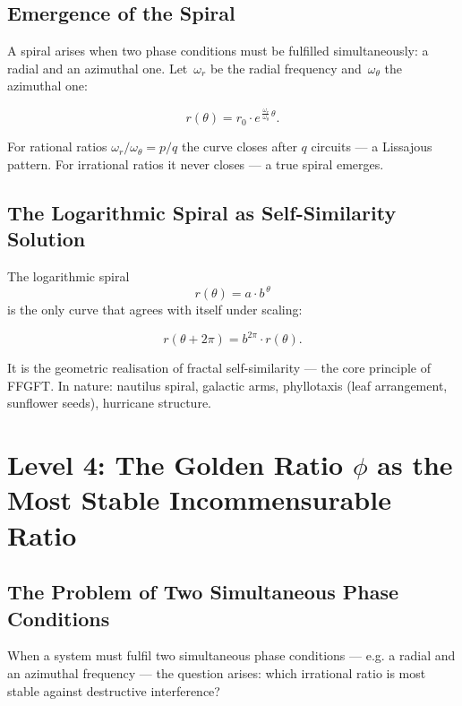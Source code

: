 \subsection{Emergence of the Spiral}

A spiral arises when two phase conditions must be fulfilled
simultaneously: a radial and an azimuthal one. Let~$\omega_r$ be the
radial frequency and~$\omega_\theta$ the azimuthal one:

\begin{equation}
  r(\theta) = r_0 \cdot e^{\,\frac{\omega_r}{\omega_\theta}\,\theta}.
\end{equation}

For rational ratios $\omega_r/\omega_\theta = p/q$ the curve closes
after $q$ circuits — a Lissajous pattern.
For irrational ratios it never closes — a true spiral emerges.

\subsection{The Logarithmic Spiral as Self-Similarity Solution}

The logarithmic spiral
\begin{equation}
  r(\theta) = a \cdot b^{\,\theta}
\end{equation}
is the only curve that agrees with itself under scaling:

\begin{equation}
  r(\theta + 2\pi) = b^{2\pi} \cdot r(\theta).
\end{equation}

It is the geometric realisation of fractal self-similarity —
the core principle of FFGFT. In nature: nautilus spiral, galactic
arms, phyllotaxis (leaf arrangement, sunflower seeds), hurricane
structure.

\section{Level 4: The Golden Ratio $\phi$ as the Most Stable
         Incommensurable Ratio}

\subsection{The Problem of Two Simultaneous Phase Conditions}

When a system must fulfil two simultaneous phase conditions —
e.g. a radial and an azimuthal frequency — the question arises:
which irrational ratio is most stable against destructive
interference?

